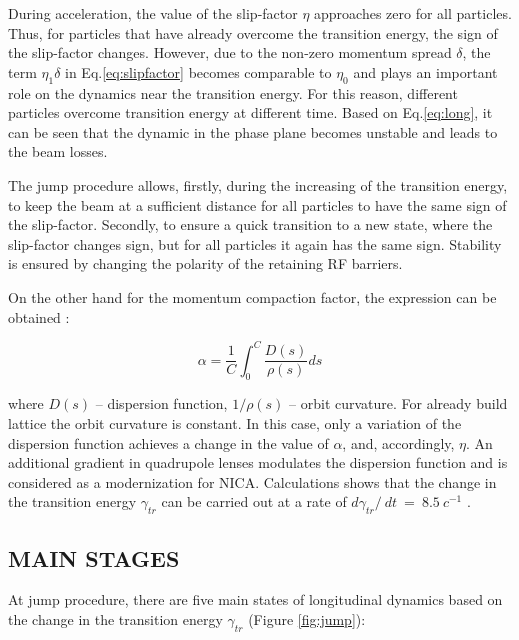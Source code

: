 \documentclass[
aps,%
12pt,%
final,%
notitlepage,%
oneside,%
onecolumn,%
nobibnotes,%
nofootinbib,%
superscriptaddress,%
noshowpacs,%
centertags]%
{revtex4}
\begin{document}
\par During acceleration, the value of the slip-factor $\eta$ approaches zero for all particles. Thus, for particles that have already overcome the transition energy, the sign of the slip-factor changes. However, due to the non-zero momentum spread $\delta$, the term $\eta_1\delta$ in Eq.\ref{eq:slipfactor} becomes comparable to $\eta_0$ and plays an important role on the dynamics near the transition energy. For this reason, different particles overcome transition energy at different time. Based on Eq.\ref{eq:long}, it can be seen that the dynamic in the phase plane becomes unstable and leads to the beam losses. 

\par The jump procedure allows, firstly, during the increasing of the transition energy, to keep the beam at a sufficient distance for all particles to have the same sign of the slip-factor.
Secondly, to ensure a quick transition to a new state, where the slip-factor changes sign, but for all particles it again has the same sign. Stability is ensured by changing the polarity of the retaining RF barriers.

\par On the other hand for the momentum compaction factor, the expression can be obtained \cite{resonant}:

\begin{equation}
\alpha=\frac{1}{C}\int_{0}^{C}{\frac{D\left(s\right)}{\rho\left(s\right)}ds}
\label{eq:alpha}
\end{equation}

\par where $D\left(s\right)$ -- dispersion function, $1/\rho\left(s\right)$ -- orbit curvature. For already build lattice the orbit curvature is constant. In this case, only a variation of the dispersion function achieves a change in the value of $\alpha$, and, accordingly, $\eta$. An additional gradient in quadrupole lenses modulates the dispersion function and is considered as a modernization for NICA. Calculations shows that the change in the transition energy $\gamma_{tr}$ can be carried out at a rate of $d\gamma_{tr}/\ dt\ =\ 8.5\ c^{-1}$ \cite{nica}.

\subsection{MAIN STAGES}
At jump procedure, there are five main states of longitudinal dynamics based on the change in the transition energy $\gamma_{tr}$ (Figure \ref{fig:jump}):
\end{document}
